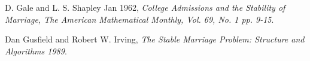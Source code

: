 \documentclass[a4paper]{article}
\begin{document}
\begin{thebibliography}{9}
  D. Gale and L. S. Shapley Jan 1962,
  \emph{College Admissions and the Stability of Marriage, The American Mathematical Monthly, Vol. 69, No. 1 pp. 9-15}.

  Dan Gusfield and Robert W. Irving,
  \emph{The Stable Marriage Problem: Structure and Algorithms 1989}.

\end{thebibliography}
\end{document}
